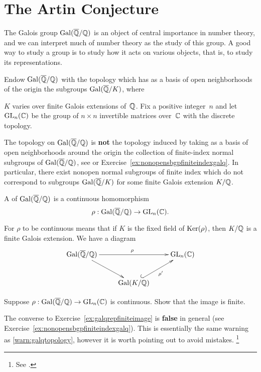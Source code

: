 \section{The Artin Conjecture}\label{sec:artin}

The Galois group $\operatorname{Gal}(\overline{\mathbb{Q}}/\mathbb{Q})$ is an object of central importance
in number theory, and we can interpret much of number theory as the
study of this group.  A good way to study a group is to study how it
acts on various objects, that is, to study its representations.

Endow $\operatorname{Gal}(\overline{\mathbb{Q}}/\mathbb{Q})$ with the topology which has as a basis of open neighborhoods
of the origin the subgroups $\operatorname{Gal}(\overline{\mathbb{Q}}/K)$, where~{$K$ varies
over finite Galois extensions of~$\mathbb{Q}$.
Fix a positive integer~$n$ and let $\operatorname{GL}_n(\mathbb{C})$ be the group of
$n\times n$ invertible matrices over~$\mathbb{C}$ with the discrete topology.

\begin{warning}\label{warn:galqtopology}
	The topology on $\operatorname{Gal}(\overline{\mathbb{Q}}/\mathbb{Q})$ is {\bf not} the topology induced
	by taking as a basis of open neighborhoods around the origin
	the collection of finite-index normal subgroups of $\operatorname{Gal}(\overline{\mathbb{Q}}/\mathbb{Q})$,
	see \cite[Chapter 7]{milne:FT} or
	Exercise~\ref{ex:nonopensbgpfiniteindexgalq}. In particular,
	there exist nonopen normal subgroups of finite index which
	do not correspond to subgroups $\operatorname{Gal}(\overline{\mathbb{Q}}/K)$ for some
	finite Galois extension $K/\mathbb{Q}$.
\end{warning}

\begin{definition}
A  of $\operatorname{Gal}(\overline{\mathbb{Q}}/\mathbb{Q})$
is a continuous homomorphism
$$
  \rho:\operatorname{Gal}(\overline{\mathbb{Q}}/\mathbb{Q})\to \operatorname{GL}_n(\mathbb{C}).
$$
\end{definition}
For $\rho$ to be continuous means that if $K$ is the fixed
field of $\operatorname{Ker}(\rho)$, then $K/\mathbb{Q}$ is a finite Galois extension.  We have
a diagram
$$\xymatrix{ {\galq}\ar[rr]^{\rho}\ar[dr]& &{\GL_n(\C)}\\
&{\Gal(K/\Q)}\ar@{^{(}->}[ur]_{\rho'}}
$$

\begin{exercise}\label{ex:galqrepfiniteimage}
	Suppose $\rho:\operatorname{Gal}(\overline{\mathbb{Q}}/\mathbb{Q})\to\operatorname{GL}_n(\mathbb{C})$ is continuous.
	Show that the image is finite.
\end{exercise}

\begin{remark}
	The converse to Exercise~\ref{ex:galqrepfiniteimage}
	is \textbf{false} in general (see
	Exercise~\ref{ex:nonopensbgpfiniteindexgalq}).
	This is essentially the same warning as
	\ref{warn:galqtopology}, however it is worth
	pointing out to avoid mistakes.
	\footnote{See \cite[p. 1]{artinconjectureLectureNotes}.}
\end{remark}

}
